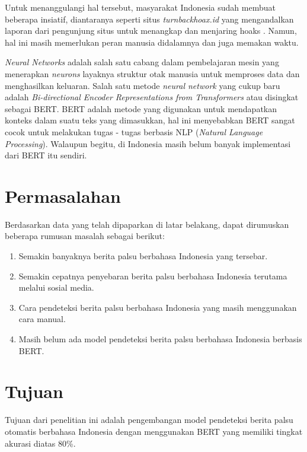 Untuk menanggulangi hal tersebut, masyarakat Indonesia sudah membuat beberapa insiatif, diantaranya seperti situs \textit{turnbackhoax.id} yang mengandalkan laporan dari pengunjung situs untuk menangkap dan menjaring hoaks \cite{turnbackhoax_works}. Namun, hal ini masih memerlukan peran manusia didalamnya dan juga memakan waktu.

\textit{Neural Networks} adalah salah satu cabang dalam pembelajaran mesin yang menerapkan \textit{neurons} layaknya struktur otak manusia untuk memproses data dan menghasilkan keluaran. Salah satu metode \textit{neural network} yang cukup baru adalah \textit{Bi-directional Encoder Representations from Transformers} atau disingkat sebagai BERT. BERT adalah metode yang digunakan untuk mendapatkan konteks dalam suatu teks yang dimasukkan, hal ini menyebabkan BERT sangat cocok untuk melakukan tugas - tugas berbasis NLP (\textit{Natural Language Processing}). Walaupun begitu, di Indonesia masih belum banyak implementasi dari BERT itu sendiri.

\section{Permasalahan}
\label{sec:permasalahan}

Berdasarkan data yang telah dipaparkan di latar belakang, dapat dirumuskan beberapa rumusan masalah sebagai berikut:

\begin{enumerate}[itemsep=-0.2em]
      \item Semakin banyaknya berita palsu berbahasa Indonesia yang tersebar.

      \item Semakin cepatnya penyebaran berita palsu berbahasa Indonesia terutama melalui sosial media.

      \item Cara pendeteksi berita palsu berbahasa Indonesia yang masih menggunakan cara manual.

      \item Masih belum ada model pendeteksi berita palsu berbahasa Indonesia berbasis BERT.

\end{enumerate}

\section{Tujuan}
\label{sec:Tujuan}

Tujuan dari penelitian ini adalah pengembangan model pendeteksi berita palsu otomatis berbahasa Indonesia dengan menggunakan BERT yang memiliki tingkat akurasi diatas 80\%.

